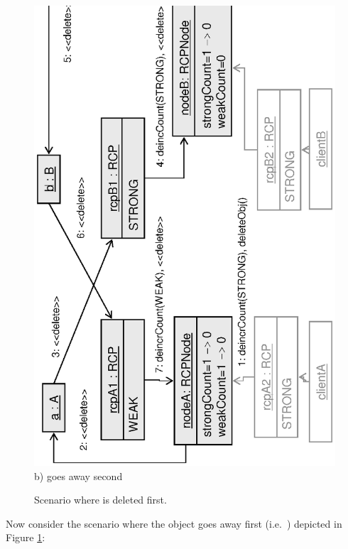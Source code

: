 \documentclass[pdf,ps2pdf,11pt]{SANDreport}
\begin{document}
{\begin{figure}
\begin{center}
\includegraphics*[angle=270,scale=0.65]{CircularRCP_A_B_ClientB_2}
\\[2ex] b) {} goes away second \\[3ex]
\end{center}
\caption{
\label{fig:CircularRCP_A_B_ClientB}
Scenario where {} is deleted first.  }
\end{figure}
\esinglespace}


Now consider the scenario where the {} object goes
away first (i.e.\ {}) depicted in
Figure {}\ref{fig:CircularRCP_A_B_ClientB}:
\end{document}
